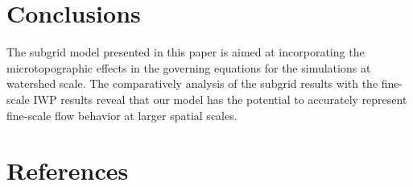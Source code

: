 \documentclass[review,11pt]{elsarticle}
\begin{document}

\section{Conclusions}\label{conclusion}
The subgrid model presented in this paper is aimed at incorporating the microtopographic effects in the governing equations for the simulations at watershed scale. The comparatively analysis of the subgrid results with the fine-scale IWP results reveal that our model has the potential to accurately represent fine-scale flow behavior at larger spatial scales.
\section*{References}


\end{document}
